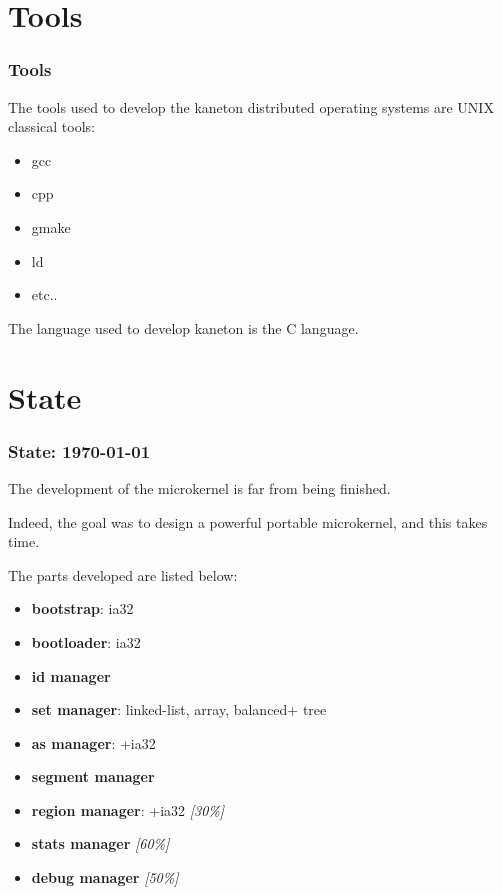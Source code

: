 \documentclass[8pt]{beamer}
\newcommand{\nl}[0]{\vspace{0.4cm}}
\begin{document}
%
%

\section{Tools}


\begin{frame}
  \frametitle{Tools}

  The tools used to develop the kaneton distributed operating systems
  are UNIX classical tools:

  \begin{itemize}
    \item
      gcc
    \item
      cpp
    \item
      gmake
    \item
      ld
    \item
      etc..
  \end{itemize}

  \nl

  The language used to develop kaneton is the C language.
\end{frame}

%
%

\section{State}


\begin{frame}
  \frametitle{State: \textbf{\today}}

  The development of the microkernel is far from being finished.

  \nl

  Indeed, the goal was to design a powerful portable microkernel, and this
  takes time.

  \nl

  The parts developed are listed below:

  \begin{itemize}[<+->]
    \item
      \textbf{bootstrap}: ia32
    \item
      \textbf{bootloader}: ia32
    \item
      \textbf{id manager}
    \item
      \textbf{set manager}: linked-list, array, balanced+ tree
    \item
      \textbf{as manager}: +ia32
    \item
      \textbf{segment manager}
    \item
      \textbf{region manager}: +ia32 \textit{[30\%]}
    \item
      \textbf{stats manager} \textit{[60\%]}
    \item
      \textbf{debug manager} \textit{[50\%]}
  \end{itemize}
\end{frame}
\end{document}
